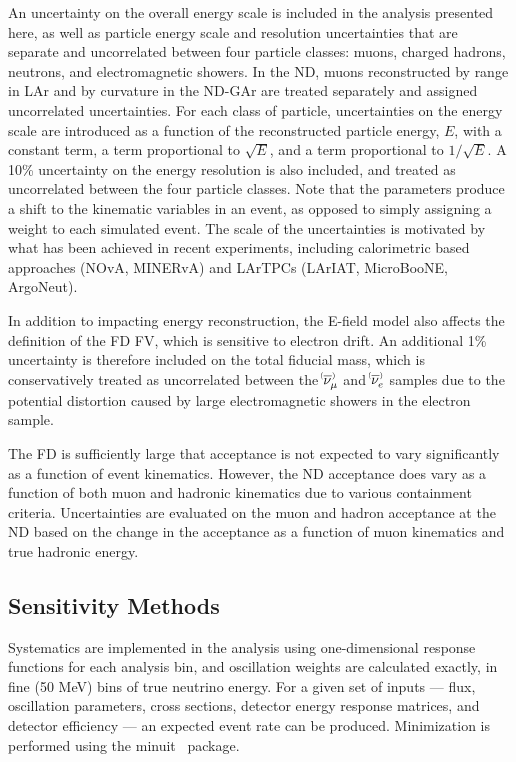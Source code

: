 An uncertainty on the overall energy scale is included in the analysis presented here, as well as particle energy scale and resolution uncertainties that are separate and uncorrelated between four particle classes: muons, charged hadrons, neutrons, and electromagnetic showers. In the ND, muons reconstructed by range in LAr and by curvature in the ND-GAr are treated separately and assigned uncorrelated uncertainties. For each class of particle, uncertainties on the energy scale are introduced as a function of the reconstructed particle energy, $E$, with a constant term, a term proportional to $\sqrt{E}$, and a term proportional to $1/\sqrt{E}$. A 10\% uncertainty on the energy resolution is also included, and treated as uncorrelated between the four particle classes. Note that the parameters produce a shift to the kinematic variables in an event, as opposed to simply assigning a weight to each simulated event. The scale of the uncertainties is motivated by what has been achieved in recent experiments, including calorimetric based approaches (NOvA, MINERvA) and LArTPCs (LArIAT, MicroBooNE, ArgoNeut).

In addition to impacting energy reconstruction, the E-field model also affects the definition of the FD FV, which is sensitive to electron drift. An additional 1\% uncertainty is therefore included on the total fiducial mass, which is conservatively treated as uncorrelated between the $\nu^{\bracketbar}_{\mu}$ and $\nu^{\bracketbar}_{e}$ samples due to the potential distortion caused by large electromagnetic showers in the electron sample.

The FD is sufficiently large that acceptance is not expected to vary significantly as a function of event kinematics. However, the ND acceptance does vary as a function of both muon and hadronic kinematics due to various containment criteria. Uncertainties are evaluated on the muon and hadron acceptance at the ND based on the change in the acceptance as a function of muon kinematics and true hadronic energy.

\subsection{Sensitivity Methods}
Systematics are implemented in the analysis using one-dimensional response functions for each analysis bin, and oscillation weights are calculated exactly, in fine (50 MeV) bins of true neutrino energy. For a given set of inputs --- flux, oscillation parameters, cross sections, detector energy response matrices, and detector efficiency --- an expected event rate can be produced. Minimization is performed using the {\sc minuit}~\cite{James:1994vla} package.

